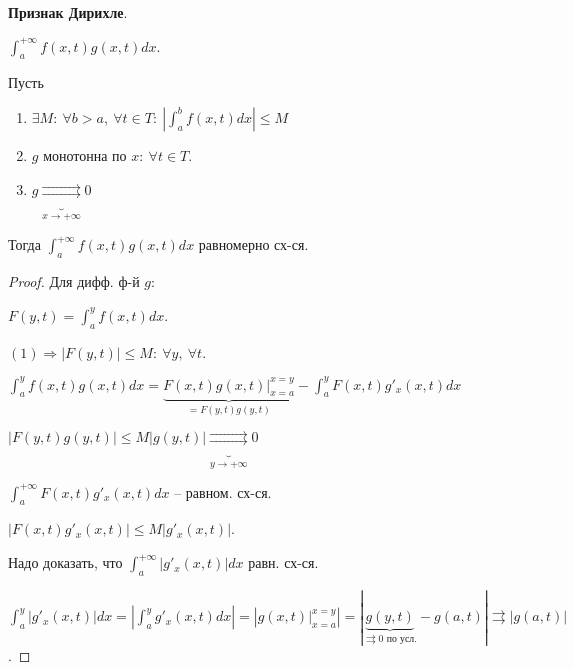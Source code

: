 \begin{theorem}
    \textbf{Признак Дирихле}.

    $\int_{a}^{+\infty} { f(x, t) g(x, t) d x }$.

    Пусть

    \begin{enumerate}
        \item {
            $\exists M: \ \forall b > a, \ \forall t \in T: \ \left| \int_{a}^{b} { f(x, t) dx } \right| \leq M$
        }
        \item {
            $g$ монотонна по $x: \ \forall t \in T$.
        }
        \item {
            $g \underbrace{\rightrightarrows}_{x \rightarrow +\infty} 0$
        }
    \end{enumerate}

    Тогда $\int_{a}^{+\infty} { f(x, t) g(x, t) d x }$ равномерно сх-ся.
\end{theorem}

\begin{proof}
    Для дифф. ф-й $g$:

    $F(y, t) = \int_{a}^{y} { f(x, t) dx }$.

    $(1) \Rightarrow |F(y, t)| \leq M: \ \forall y, \ \forall t$.

    $\int_{a}^{y} { f(x, t) g(x, t) dx } = \underbrace{F(x, t) g(x, t)|_{x=a}^{x=y}}_{= F(y, t) g(y, t)} - \int_{a}^{y} { F(x, t) g'_x(x, t) d x }$

    $\left| F(y, t) g(y, t) \right| \leq M | g(y, t) | \underbrace{\rightrightarrows}_{y \rightarrow +\infty} 0$

    $ \int_{a}^{+\infty} { F(x, t) g'_x(x, t) d x } $ -- равном. сх-ся.

    $|F(x, t) g'_x(x, t)| \leq M | g'_x(x, t) |$.

    Надо доказать, что $\int_{a}^{+\infty} { | g'_x (x, t) | dx }$ равн. сх-ся.

    $\int_{a}^{y} { | g'_x (x, t) | dx } = \left| \int_{a}^{y} { g'_x (x, t) dx } \right| = \left| g(x, t)|_{x=a}^{x=y} \right| = | \underbrace{g(y, t)}_{\rightrightarrows 0 \text{ по усл.}} - g(a, t) | \rightrightarrows |g(a, t)|$.

\end{proof}

